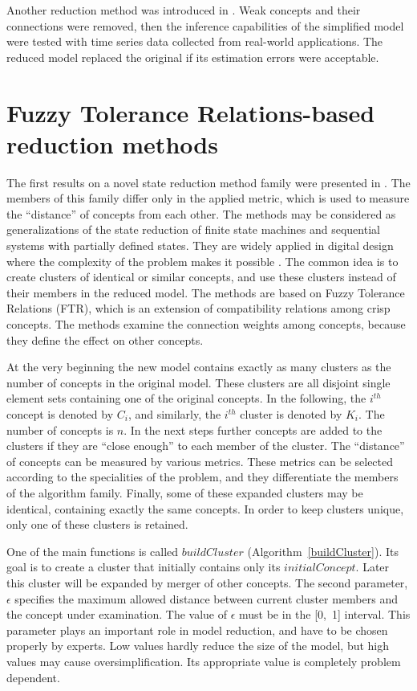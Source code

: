 \documentclass[graybox]{svmult}
\begin{document}
Another reduction method was introduced in \cite{Homenda2014}. Weak concepts and their connections were removed, then the inference capabilities of the simplified model were tested with time series data collected from real-world applications. The reduced model replaced the original if its estimation errors were acceptable.

\section{Fuzzy Tolerance Relations-based reduction methods}
\label{sec:2}

The first results on a novel state reduction method family were presented in \cite{hatwagner2014strategic,hatwagner2015new}. The members of this family differ only in the applied metric, which is used to measure the ``distance'' of concepts from each other. The methods may be considered as generalizations of the state reduction of finite state machines and sequential systems with partially defined states. They are widely applied in digital design where the complexity of the problem makes it possible \cite{kohaviz.jhan.k.2009}. The common idea is to create clusters of identical or similar concepts, and use these clusters instead of their members in the reduced model. The methods are based on Fuzzy Tolerance Relations (FTR), which is an extension of compatibility relations among crisp concepts. The methods examine the connection weights among concepts, because they define the effect on other concepts.

At the very beginning the new model contains exactly as many clusters as the number of concepts in the original model. These clusters are all disjoint single element sets containing one of the original concepts. In the following, the $i^{th}$ concept is denoted by $C_i$, and similarly, the $i^{th}$ cluster is denoted by $K_i$. The number of concepts is $n$. In the next steps further concepts are added to the clusters if they are ``close enough'' to each member of the cluster. The ``distance'' of concepts can be measured by various metrics. These metrics can be selected according to the specialities of the problem, and they differentiate the members of the algorithm family. Finally, some of these expanded clusters may be identical, containing exactly the same concepts. In order to keep clusters unique, only one of these clusters is retained.

One of the main functions is called $buildCluster$ (Algorithm~\ref{buildCluster}). Its goal is to create a cluster that initially contains only its $initialConcept$. Later this cluster will be expanded by merger of other concepts. The second parameter, $\epsilon$ specifies the maximum allowed distance between current cluster members and the concept under examination. The value of $\epsilon$ must be in the [0,~1] interval. This parameter plays an important role in model reduction, and have to be chosen properly by experts. Low values hardly reduce the size of the model, but high values may cause oversimplification. Its appropriate value is completely problem dependent.
\end{document}
